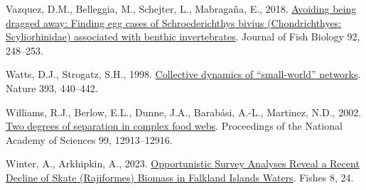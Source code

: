 \documentclass[
]{article}
\newlength{\cslhangindent}
\newenvironment{CSLReferences}[2] %
 {\begin{list}{}{%
  \setlength{\itemindent}{0pt}
  \setlength{\leftmargin}{0pt}
  \setlength{\parsep}{0pt}
  \ifodd #1
   \setlength{\leftmargin}{\cslhangindent}
   \setlength{\itemindent}{-1\cslhangindent}
  \fi
  \setlength{\itemsep}{#2\baselineskip}}}
 {\end{list}}
\begin{document}
\begin{CSLReferences}{1}{0}
Vazquez, D.M., Belleggia, M., Schejter, L., Mabragaña, E., 2018.
\href{https://doi.org/10.1111/jfb.13490}{Avoiding being dragged away:
Finding egg cases of {Schroederichthys} bivius ({Chondrichthyes}:
{Scyliorhinidae}) associated with benthic invertebrates}. Journal of
Fish Biology 92, 248--253.

Watts, D.J., Strogatz, S.H., 1998.
\href{https://doi.org/10.1038/30918}{Collective dynamics of
{``small-world''} networks}. Nature 393, 440--442.

Williams, R.J., Berlow, E.L., Dunne, J.A., Barabási, A.-L., Martinez,
N.D., 2002. \href{https://doi.org/10.1073/pnas.192448799}{Two degrees of
separation in complex food webs}. Proceedings of the National Academy of
Sciences 99, 12913--12916.

Winter, A., Arkhipkin, A., 2023.
\href{https://doi.org/10.3390/fishes8010024}{Opportunistic {Survey
Analyses Reveal} a {Recent Decline} of {Skate} ({Rajiformes}) {Biomass}
in {Falkland Islands Waters}}. Fishes 8, 24.

\end{CSLReferences}
\end{document}
